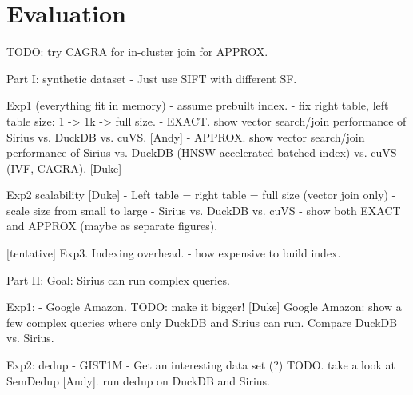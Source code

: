 \section{Evaluation}\label{sec:evaluation}


TODO: try CAGRA for in-cluster join for APPROX.

Part I:
synthetic dataset
- Just use SIFT with different SF.

Exp1 (everything fit in memory)
- assume prebuilt index.
- fix right table, left table size: 1 -> 1k -> full size.
- EXACT. show vector search/join performance of Sirius vs. DuckDB vs. cuVS. [Andy]
- APPROX. show vector search/join performance of Sirius vs. DuckDB (HNSW accelerated batched index) vs. cuVS (IVF, CAGRA). [Duke]


Exp2 scalability [Duke]
- Left table = right table = full size (vector join only)
- scale size from small to large
- Sirius vs. DuckDB vs. cuVS
- show both EXACT and APPROX (maybe as separate figures).

[tentative] Exp3. Indexing overhead.
- how expensive to build index.

Part II:
Goal: Sirius can run complex queries.

Exp1:
- Google Amazon. TODO: make it bigger! [Duke]
Google Amazon: show a few complex queries where only DuckDB and Sirius can run. Compare DuckDB vs. Sirius.

Exp2: dedup
- GIST1M
- Get an interesting data set (?) TODO. take a look at SemDedup [Andy].
run dedup on DuckDB and Sirius.



